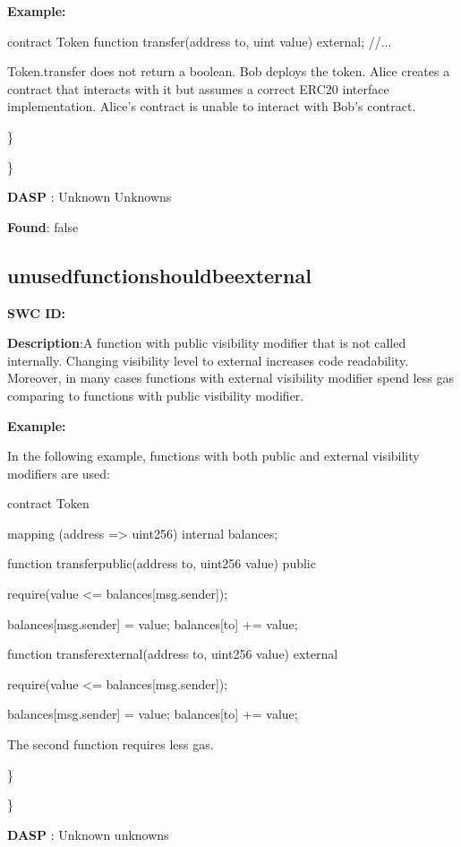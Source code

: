 \documentclass{article}
\begin{document}
\textbf{Example:} 

contract Token{
    function transfer(address to, uint value) external;
    //...
}

Token.transfer does not return a boolean. Bob deploys the token. Alice creates a contract that interacts with it but assumes a correct ERC20 interface implementation. Alice's contract is unable to interact with Bob's contract.

\} 

\} 

\textbf{DASP} : Unknown Unknowns

\textbf{Found}: false

\subsection{unused\textunderscore function\textunderscore should\textunderscore be\textunderscore external} 
\textbf{SWC \textunderscore ID:} 

\textbf{Description}:A function with public visibility modifier that is not called internally. Changing visibility level to external increases code readability. Moreover, in many cases functions with external visibility modifier spend less gas comparing to functions with public visibility modifier.


\textbf{Example:} 

In the following example, functions with both public and external visibility modifiers are used:

contract Token {

    mapping (address => uint256) internal \textunderscore balances;

    function transfer\textunderscore public(address to, uint256 value) public {
        require(value <= \textunderscore balances[msg.sender]);

        \textunderscore balances[msg.sender] \textendash = value;
        \textunderscore balances[to] += value;
    }

    function transfer\textunderscore external(address to, uint256 value) external {
        require(value <= \textunderscore balances[msg.sender]);

        \textunderscore balances[msg.sender] \textendash = value;
        \textunderscore balances[to] += value;
    }
}

The second function requires less gas.

\} 

\} 

\textbf{DASP} : Unknown unknowns
\end{document}
